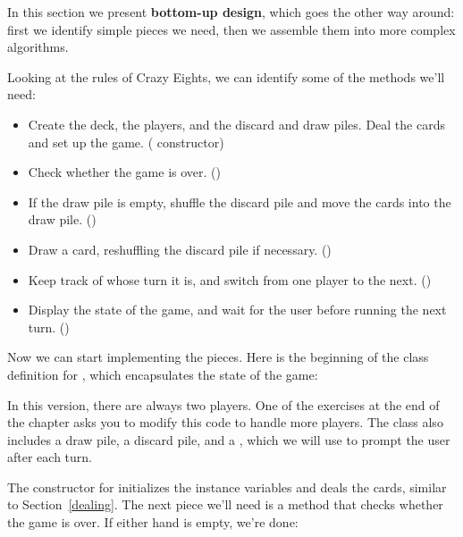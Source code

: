 In this section we present {\bf bottom-up design}, which goes the other way around: first we identify simple pieces we need, then we assemble them into more complex algorithms.

Looking at the rules of Crazy Eights, we can identify some of the methods we'll need:

\begin{itemize}

\item Create the deck, the players, and the discard and draw piles. Deal the cards and set up the game. ( constructor)

\item Check whether the game is over. ()

\item If the draw pile is empty, shuffle the discard pile and move the cards into the draw pile. ()

\item Draw a card, reshuffling the discard pile if necessary. ()

\item Keep track of whose turn it is, and switch from one player to the next. ()

\item Display the state of the game, and wait for the user before running the next turn. ()

\end{itemize}

Now we can start implementing the pieces.
Here is the beginning of the class definition for , which encapsulates the state of the game:


\begin{code}
public class Eights {

    private Player one;
    private Player two;
    private Hand drawPile;
    private Hand discardPile;
    private Scanner in;
\end{code}

In this version, there are always two players.
One of the exercises at the end of the chapter asks you to modify this code to handle more players.
The  class also includes a draw pile, a discard pile, and a , which we will use to prompt the user after each turn.

The constructor for  initializes the instance variables and deals the cards, similar to Section~\ref{dealing}.
%
%
%
%
%
%
%
The next piece we'll need is a method that checks whether the game is over.
If either hand is empty, we're done:

